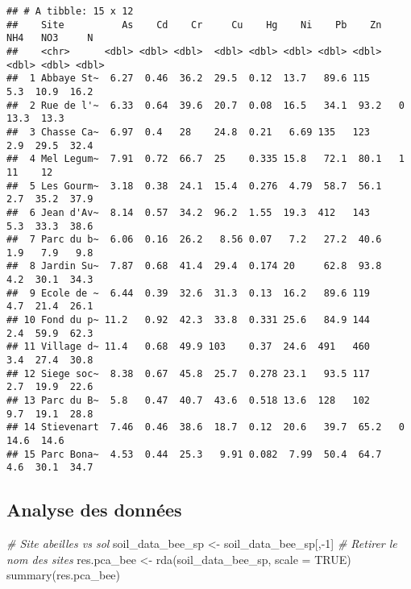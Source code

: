 \documentclass[
]{article}
\newenvironment{Shaded}{\begin{snugshade}}{\end{snugshade}}
\newcommand{\AttributeTok}[1]{\textcolor[rgb]{0.77,0.63,0.00}{#1}}
\newcommand{\CommentTok}[1]{\textcolor[rgb]{0.56,0.35,0.01}{\textit{#1}}}
\newcommand{\ConstantTok}[1]{\textcolor[rgb]{0.00,0.00,0.00}{#1}}
\newcommand{\DecValTok}[1]{\textcolor[rgb]{0.00,0.00,0.81}{#1}}
\newcommand{\FunctionTok}[1]{\textcolor[rgb]{0.00,0.00,0.00}{#1}}
\newcommand{\NormalTok}[1]{#1}
\newcommand{\OtherTok}[1]{\textcolor[rgb]{0.56,0.35,0.01}{#1}}
\newcommand{\SpecialCharTok}[1]{\textcolor[rgb]{0.00,0.00,0.00}{#1}}
\begin{document}
\begin{verbatim}
## # A tibble: 15 x 12
##    Site          As    Cd    Cr     Cu    Hg    Ni    Pb    Zn   NH4   NO3     N
##    <chr>      <dbl> <dbl> <dbl>  <dbl> <dbl> <dbl> <dbl> <dbl> <dbl> <dbl> <dbl>
##  1 Abbaye St~  6.27  0.46  36.2  29.5  0.12  13.7   89.6 115     5.3  10.9  16.2
##  2 Rue de l'~  6.33  0.64  39.6  20.7  0.08  16.5   34.1  93.2   0    13.3  13.3
##  3 Chasse Ca~  6.97  0.4   28    24.8  0.21   6.69 135   123     2.9  29.5  32.4
##  4 Mel Legum~  7.91  0.72  66.7  25    0.335 15.8   72.1  80.1   1    11    12  
##  5 Les Gourm~  3.18  0.38  24.1  15.4  0.276  4.79  58.7  56.1   2.7  35.2  37.9
##  6 Jean d'Av~  8.14  0.57  34.2  96.2  1.55  19.3  412   143     5.3  33.3  38.6
##  7 Parc du b~  6.06  0.16  26.2   8.56 0.07   7.2   27.2  40.6   1.9   7.9   9.8
##  8 Jardin Su~  7.87  0.68  41.4  29.4  0.174 20     62.8  93.8   4.2  30.1  34.3
##  9 Ecole de ~  6.44  0.39  32.6  31.3  0.13  16.2   89.6 119     4.7  21.4  26.1
## 10 Fond du p~ 11.2   0.92  42.3  33.8  0.331 25.6   84.9 144     2.4  59.9  62.3
## 11 Village d~ 11.4   0.68  49.9 103    0.37  24.6  491   460     3.4  27.4  30.8
## 12 Siege soc~  8.38  0.67  45.8  25.7  0.278 23.1   93.5 117     2.7  19.9  22.6
## 13 Parc du B~  5.8   0.47  40.7  43.6  0.518 13.6  128   102     9.7  19.1  28.8
## 14 Stievenart  7.46  0.46  38.6  18.7  0.12  20.6   39.7  65.2   0    14.6  14.6
## 15 Parc Bona~  4.53  0.44  25.3   9.91 0.082  7.99  50.4  64.7   4.6  30.1  34.7
\end{verbatim}

\hypertarget{analyse-des-donnuxe9es}{%
\subsection{Analyse des données}\label{analyse-des-donnuxe9es}}

\begin{Shaded}
\begin{Highlighting}[]
\CommentTok{\# Site abeilles vs sol}
\NormalTok{soil\_data\_bee\_sp }\OtherTok{\textless{}{-}}\NormalTok{ soil\_data\_bee\_sp[,}\SpecialCharTok{{-}}\DecValTok{1}\NormalTok{] }\CommentTok{\# Retirer le nom des sites}
\NormalTok{res.pca\_bee }\OtherTok{\textless{}{-}} \FunctionTok{rda}\NormalTok{(soil\_data\_bee\_sp, }\AttributeTok{scale =} \ConstantTok{TRUE}\NormalTok{)}
\FunctionTok{summary}\NormalTok{(res.pca\_bee)}
\end{Highlighting}
\end{Shaded}
\end{document}
